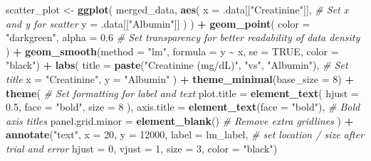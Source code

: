 \documentclass[
]{article}
\newenvironment{Shaded}{\begin{snugshade}}{\end{snugshade}}
\newcommand{\AttributeTok}[1]{\textcolor[rgb]{0.13,0.29,0.53}{#1}}
\newcommand{\CommentTok}[1]{\textcolor[rgb]{0.56,0.35,0.01}{\textit{#1}}}
\newcommand{\ConstantTok}[1]{\textcolor[rgb]{0.56,0.35,0.01}{#1}}
\newcommand{\DecValTok}[1]{\textcolor[rgb]{0.00,0.00,0.81}{#1}}
\newcommand{\FloatTok}[1]{\textcolor[rgb]{0.00,0.00,0.81}{#1}}
\newcommand{\FunctionTok}[1]{\textcolor[rgb]{0.13,0.29,0.53}{\textbf{#1}}}
\newcommand{\NormalTok}[1]{#1}
\newcommand{\OtherTok}[1]{\textcolor[rgb]{0.56,0.35,0.01}{#1}}
\newcommand{\SpecialCharTok}[1]{\textcolor[rgb]{0.81,0.36,0.00}{\textbf{#1}}}
\newcommand{\StringTok}[1]{\textcolor[rgb]{0.31,0.60,0.02}{#1}}
\begin{document}
\begin{Shaded}
\begin{Highlighting}[]
\NormalTok{scatter\_plot }\OtherTok{\textless{}{-}} \FunctionTok{ggplot}\NormalTok{(}
\NormalTok{    merged\_data,}
      \FunctionTok{aes}\NormalTok{(}
        \AttributeTok{x =}\NormalTok{ .data[[}\StringTok{"Creatinine"}\NormalTok{]], }\CommentTok{\# Set x and y for scatter }
        \AttributeTok{y =}\NormalTok{ .data[[}\StringTok{"Albumin"}\NormalTok{]]}
\NormalTok{      )}
\NormalTok{  ) }\SpecialCharTok{+}
  \FunctionTok{geom\_point}\NormalTok{(}
      \AttributeTok{color =} \StringTok{"darkgreen"}\NormalTok{,}
      \AttributeTok{alpha =} \FloatTok{0.6} \CommentTok{\# Set transparency for better readability of data density}
\NormalTok{  ) }\SpecialCharTok{+}
  \FunctionTok{geom\_smooth}\NormalTok{(}\AttributeTok{method =} \StringTok{"lm"}\NormalTok{, }\AttributeTok{formula =}\NormalTok{ y }\SpecialCharTok{\textasciitilde{}}\NormalTok{ x, }\AttributeTok{se =} \ConstantTok{TRUE}\NormalTok{, }\AttributeTok{color =} \StringTok{"black"}\NormalTok{) }\SpecialCharTok{+}   
    \FunctionTok{labs}\NormalTok{(}
      \AttributeTok{title =} \FunctionTok{paste}\NormalTok{(}\StringTok{"Creatinine (mg/dL)"}\NormalTok{, }\StringTok{"vs"}\NormalTok{, }\StringTok{"Albumin"}\NormalTok{), }\CommentTok{\# Set title}
        \AttributeTok{x =} \StringTok{"Creatinine"}\NormalTok{,}
        \AttributeTok{y =} \StringTok{"Albumin"}
\NormalTok{  ) }\SpecialCharTok{+}
  \FunctionTok{theme\_minimal}\NormalTok{(}\AttributeTok{base\_size =} \DecValTok{8}\NormalTok{) }\SpecialCharTok{+}
  \FunctionTok{theme}\NormalTok{( }\CommentTok{\# Set formatting for label and text}
    \AttributeTok{plot.title =} \FunctionTok{element\_text}\NormalTok{(}
      \AttributeTok{hjust =} \FloatTok{0.5}\NormalTok{,}
      \AttributeTok{face =} \StringTok{"bold"}\NormalTok{,}
      \AttributeTok{size =} \DecValTok{8}
\NormalTok{    ),}
    \AttributeTok{axis.title =} \FunctionTok{element\_text}\NormalTok{(}\AttributeTok{face =} \StringTok{"bold"}\NormalTok{), }\CommentTok{\# Bold axis titles}
    \AttributeTok{panel.grid.minor =} \FunctionTok{element\_blank}\NormalTok{() }\CommentTok{\# Remove extra gridlines}
\NormalTok{  ) }\SpecialCharTok{+}
  \FunctionTok{annotate}\NormalTok{(}\StringTok{"text"}\NormalTok{, }\AttributeTok{x =} \DecValTok{20}\NormalTok{, }\AttributeTok{y =} \DecValTok{12000}\NormalTok{, }\AttributeTok{label =}\NormalTok{ lm\_label, }\CommentTok{\# set location / size after trial and error }
           \AttributeTok{hjust =} \DecValTok{0}\NormalTok{, }\AttributeTok{vjust =} \DecValTok{1}\NormalTok{, }\AttributeTok{size =} \DecValTok{3}\NormalTok{, }\AttributeTok{color =} \StringTok{"black"}\NormalTok{)}
  

\end{Highlighting}
\end{Shaded}
\end{document}
